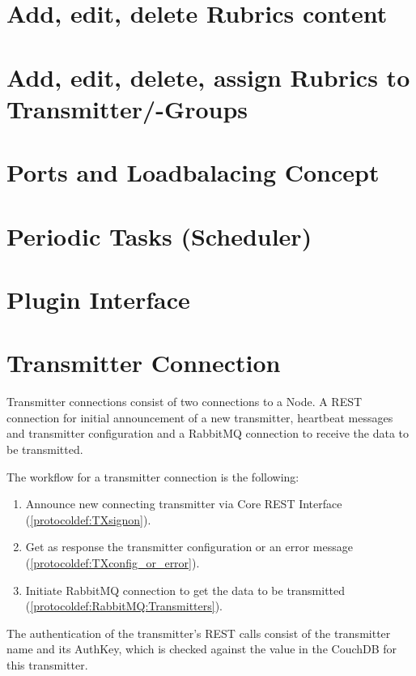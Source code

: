 \section{Add, edit, delete Rubrics content}

\section{Add, edit, delete, assign Rubrics to Transmitter/-Groups}

\section{Ports and Loadbalacing Concept}

\section{Periodic Tasks (Scheduler)}

\section{Plugin Interface}

\section{Transmitter Connection}
Transmitter connections consist of two connections to a Node. A REST connection for initial announcement of a new transmitter, heartbeat messages and transmitter configuration and a RabbitMQ connection to receive the data to be transmitted.

The workflow for a transmitter connection is the following:
\begin{enumerate}
\item Announce new connecting transmitter via Core REST Interface (\ref{protocoldef:TXsignon}).
\item Get as response the transmitter configuration or an error message (\ref{protocoldef:TXconfig_or_error}).
\item Initiate RabbitMQ connection to get the data to be transmitted (\ref{protocoldef:RabbitMQ:Transmitters}).
\end{enumerate}

The authentication of the transmitter's REST calls consist of the transmitter name and its AuthKey, which is checked against the value in the CouchDB for this transmitter.




